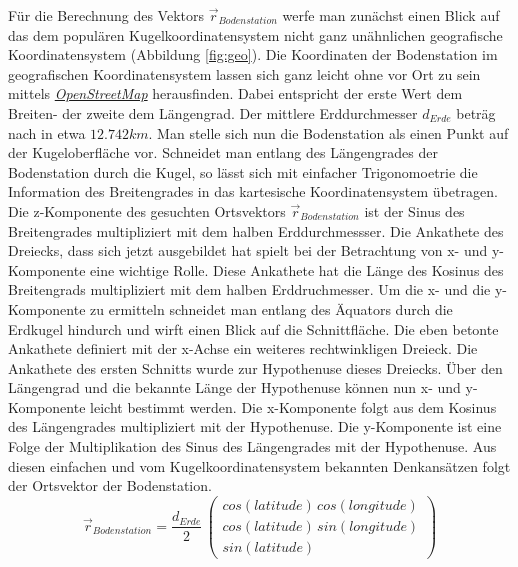 Für die Berechnung des Vektors \ensuremath{\vec{r}_{Bodenstation}} werfe man zunächst einen Blick auf das dem populären Kugelkoordinatensystem nicht ganz unähnlichen geografische Koordinatensystem (Abbildung \ref{fig:geo}). Die Koordinaten der Bodenstation im geografischen Koordinatensystem lassen sich ganz leicht ohne vor Ort zu sein mittels \href{http://www.openstreetmap.org/search?query=47.66530%2C9.44805#map=19/47.66530/9.44805}{\textit{OpenStreetMap}} herausfinden. Dabei entspricht der erste Wert dem Breiten- der zweite dem Längengrad. Der mittlere Erddurchmesser \ensuremath{d_{Erde}} beträg nach \cite{Wiki:Erde} in etwa \ensuremath{12.742 km}.
\newpar
Man stelle sich nun die Bodenstation als einen Punkt auf der Kugeloberfläche vor. Schneidet man entlang des Längengrades der Bodenstation durch die Kugel, so lässt sich mit einfacher Trigonomoetrie die Information des Breitengrades in das kartesische Koordinatensystem übetragen. Die z-Komponente des gesuchten Ortsvektors \ensuremath{\vec{r}_{Bodenstation}} ist der Sinus des Breitengrades multipliziert mit dem halben Erddurchmessser. Die Ankathete des Dreiecks, dass sich jetzt ausgebildet hat spielt bei der Betrachtung von x- und y-Komponente eine wichtige Rolle. Diese Ankathete hat die Länge des Kosinus des Breitengrads multipliziert mit dem halben Erddruchmesser. Um die x- und die y-Komponente zu ermitteln schneidet man entlang des Äquators durch die Erdkugel hindurch und wirft einen Blick auf die Schnittfläche. Die eben betonte Ankathete definiert mit der x-Achse ein weiteres rechtwinkligen Dreieck. Die Ankathete des ersten Schnitts wurde zur Hypothenuse dieses Dreiecks. Über den Längengrad und die bekannte Länge der Hypothenuse können nun x- und y-Komponente leicht bestimmt werden. Die x-Komponente folgt aus dem Kosinus des Längengrades multipliziert mit der Hypothenuse. Die y-Komponente ist eine Folge der Multiplikation des Sinus des Längengrades mit der Hypothenuse. Aus diesen einfachen und vom Kugelkoordinatensystem bekannten Denkansätzen folgt der Ortsvektor der Bodenstation. 
\begin{equation}
	\vec{r}_{Bodenstation}=\frac{d_{Erde}}{2}\,\left(\begin{array} {c}cos(latitude)\,cos(longitude)\\cos(latitude)\,sin(longitude)\\sin(latitude)\end{array}\right)
\end{equation} 
